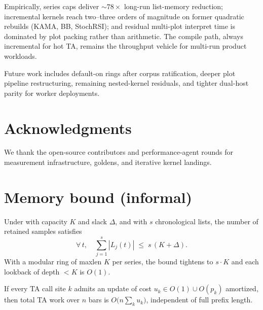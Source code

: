 \documentclass[11pt,a4paper]{article}
\begin{document}
Empirically, series caps deliver $\sim 78\times$ long-run list-memory reduction;
incremental kernels reach two--three orders of magnitude on former quadratic
rebuilds (KAMA, BB, StochRSI); and residual multi-plot interpret time is
dominated by plot packing rather than arithmetic.  The compile path, always
incremental for hot TA, remains the throughput vehicle for multi-run product
workloads.

Future work includes default-on rings after corpus ratification, deeper plot
pipeline restructuring, remaining nested-kernel residuals, and tighter dual-host
parity for worker deployments.

\section*{Acknowledgments}

We thank the \pyne{} open-source contributors and performance-agent rounds for
measurement infrastructure, goldens, and iterative kernel landings.

\appendix
\section{Memory bound (informal)}
\label{app:mem}

\begin{proposition}
\label{prop:bound}
Under  with capacity $K$ and slack $\Delta$, and with
$s$ chronological lists, the number of retained samples satisfies
\begin{equation}
  \forall\, t,\quad
  \sum_{j=1}^{s} |L_j(t)| \;\le\; s\,(K+\Delta).
\end{equation}
With a modular ring of maxlen $K$ per series, the bound tightens to $s\cdot K$
and each lookback of depth $<K$ is $O(1)$.
\end{proposition}

\begin{proposition}
\label{prop:time-bound}
If every TA call site $k$ admits an update of cost $u_k\in O(1)\cup O(p_k)$
amortized, then total TA work over $n$ bars is
$O\big(n\sum_k u_k\big)$, independent of full prefix length.
\end{proposition}
\end{document}
